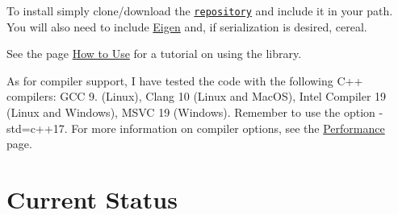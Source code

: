 \begin{DoxyItemize}
\item To install simply clone/download the \href{https://github.com/NickG-Math/Mackey}{\tt repository} and include it in your path. You will also need to include \hyperlink{namespaceEigen}{Eigen} and, if serialization is desired, cereal.
\item See the page \hyperlink{use}{How to Use} for a tutorial on using the library.
\item As for compiler support, I have tested the code with the following C++ compilers\+: G\+CC 9. (Linux), Clang 10 (Linux and Mac\+OS), Intel Compiler 19 (Linux and Windows), M\+S\+VC 19 (Windows). Remember to use the option {\ttfamily -\/std=c++17}. For more information on compiler options, see the \hyperlink{perf}{Performance} page.
\end{DoxyItemize}\hypertarget{index_status}{}\section{Current Status}\label{index_status}

